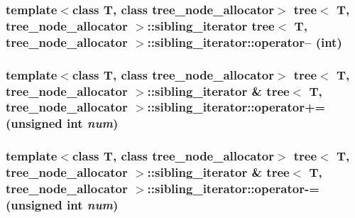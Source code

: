 \hypertarget{classtree_1_1sibling__iterator_eac6e7802aabdf7050b314af8d56c81d}{
\subsubsection{\setlength{\rightskip}{0pt plus 5cm}template$<$class T, class tree\_\-node\_\-allocator$>$ {\bf tree}$<$ T, tree\_\-node\_\-allocator $>$::{\bf sibling\_\-iterator} {\bf tree}$<$ T, tree\_\-node\_\-allocator $>$::sibling\_\-iterator::operator-- (int)}}
\label{classtree_1_1sibling__iterator_eac6e7802aabdf7050b314af8d56c81d}


\hypertarget{classtree_1_1sibling__iterator_d36b6994a50c0f73154b08ab35abf336}{
\subsubsection{\setlength{\rightskip}{0pt plus 5cm}template$<$class T, class tree\_\-node\_\-allocator$>$ {\bf tree}$<$ T, tree\_\-node\_\-allocator $>$::{\bf sibling\_\-iterator} \& {\bf tree}$<$ T, tree\_\-node\_\-allocator $>$::sibling\_\-iterator::operator+= (unsigned int {\em num})}}
\label{classtree_1_1sibling__iterator_d36b6994a50c0f73154b08ab35abf336}


\hypertarget{classtree_1_1sibling__iterator_f7b0a37317400fe16a1ad422c1ee6fa1}{
\subsubsection{\setlength{\rightskip}{0pt plus 5cm}template$<$class T, class tree\_\-node\_\-allocator$>$ {\bf tree}$<$ T, tree\_\-node\_\-allocator $>$::{\bf sibling\_\-iterator} \& {\bf tree}$<$ T, tree\_\-node\_\-allocator $>$::sibling\_\-iterator::operator-= (unsigned int {\em num})}}
\label{classtree_1_1sibling__iterator_f7b0a37317400fe16a1ad422c1ee6fa1}


